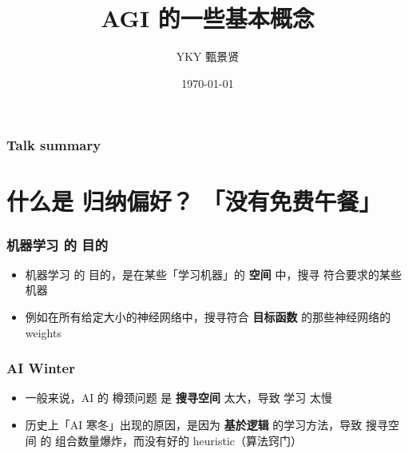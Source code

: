 \documentclass[17pt]{beamer}
\title[China AGI group]{AGI 的一些基本概念} %
\author{YKY 甄景贤} %
\institute[] %
{
Independent researcher, Hong Kong \\ %
\medskip
\textit{generic.intelligence@gmail.com} %
}
\date{\today} %
\begin{document}
\frame{\titlepage}

\begin{frame}
\frametitle{Talk summary}
\tableofcontents
\end{frame}

%
%




\section[什么是 归纳偏好？「没有免费午餐」]
{\texorpdfstring{什么是 归纳偏好？
\protect\linebreak[1] 「没有免费午餐」}
{什么是 归纳偏好？「没有免费午餐」}}
\frame{\sectionpage}

\begin{frame}
\frametitle{机器学习 的 目的}
\begin{itemize}
	\item 机器学习 的 目的，是在某些「学习机器」的 \textbf{空间} 中，搜寻 符合要求的某些机器
	\item 例如在所有给定大小的神经网络中，搜寻符合 \textbf{目标函数} 的那些神经网络的 weights
\end{itemize}
\end{frame}

\begin{frame}
\frametitle{AI Winter}
\begin{itemize}
	\item 一般来说，AI 的 樽颈问题 是 {\color{red}\textbf{搜寻空间} 太大}，导致 学习 太慢
	\item 历史上「AI 寒冬」出现的原因，是因为 \textbf{基於逻辑} 的学习方法，导致 搜寻空间 的 组合数量爆炸，而没有好的 heuristic（算法窍门）
\end{itemize}
\end{frame}
\end{document}
